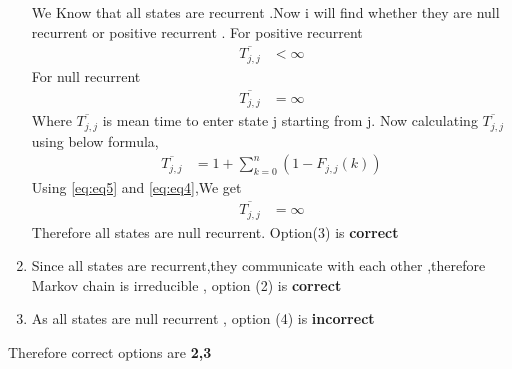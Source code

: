 \documentclass[journal,12pt,twocolumn]{IEEEtran}
\begin{document}
\begin{enumerate}
We Know that all states are recurrent .Now i will find whether they are null recurrent or positive recurrent .
For positive recurrent 
\begin{align}
    \overline{T_{j,j}}& < \infty
\end{align}
For null recurrent 
\begin{align}
    \overline{T_{j,j}}& = \infty
\end{align}
Where $\overline{T_{j,j}}$ is mean time to enter state j starting from j.
Now calculating $\overline{T_{j,j}}$ using below formula,
\begin{align}
    \overline{T_{j,j}}&=1 + \sum _{k=0}^n (1 - F_{j,j}(k))
    \label{eq:eq5}
\end{align}
Using \eqref{eq:eq5} and \eqref{eq:eq4},We get 
\begin{align}
    \overline{T_{j,j}}& = \infty
\end{align}
Therefore all states are null recurrent.
Option(3) is \textbf{correct}
 \item
    Since all states are recurrent,they communicate with each other ,therefore Markov chain is irreducible , option (2) is \textbf{correct}
 \item As all states are null recurrent , option (4) is \textbf{incorrect} 
\end{enumerate}
Therefore correct options are \textbf{2,3}
\end{document}
